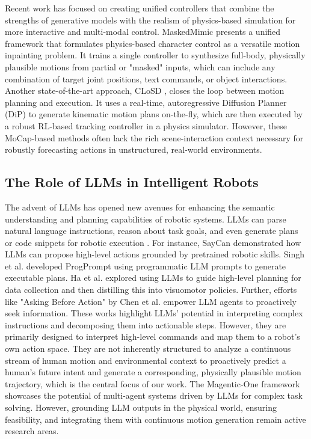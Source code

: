\documentclass[biomimetics,article,submit,pdftex,moreauthors]{Definitions/mdpi}
\begin{document}
Recent work has focused on creating unified controllers that combine the strengths of generative models with the realism of physics-based simulation for more interactive and multi-modal control. MaskedMimic \citep{tessler2024masked} presents a unified framework that formulates physics-based character control as a versatile motion inpainting problem. It trains a single controller to synthesize full-body, physically plausible motions from partial or "masked" inputs, which can include any combination of target joint positions, text commands, or object interactions. Another state-of-the-art approach, CLoSD \citep{tevet2024closd}, closes the loop between motion planning and execution. It uses a real-time, autoregressive Diffusion Planner (DiP) to generate kinematic motion plans on-the-fly, which are then executed by a robust RL-based tracking controller in a physics simulator.  However, these MoCap-based methods often lack the rich scene-interaction context necessary for robustly forecasting actions in unstructured, real-world environments.

\subsection{The Role of LLMs in Intelligent Robots}
The advent of LLMs has opened new avenues for enhancing the semantic understanding and planning capabilities of robotic systems.
LLMs can parse natural language instructions, reason about task goals, and even generate plans or code snippets for robotic execution \citep{Fan2024, Singh2023}.
For instance, SayCan \citep{Ahn2022} demonstrated how LLMs can propose high-level actions grounded by pretrained robotic skills.
Singh et al. \citep{Singh2023} developed ProgPrompt using programmatic LLM prompts to generate executable plans. Ha et al.
\citep{Ha2023} explored using LLMs to guide high-level planning for data collection and then distilling this into visuomotor policies.
Further, efforts like "Asking Before Action" by Chen et al. \citep{Chen2023} empower LLM agents to proactively seek information.
These works highlight LLMs' potential in interpreting complex instructions and decomposing them into actionable steps. However, they are primarily designed to interpret high-level commands and map them to a robot's own action space. They are not inherently structured to analyze a continuous stream of human motion and environmental context to proactively predict a human's future intent and generate a corresponding, physically plausible motion trajectory, which is the central focus of our work.
The Magentic-One framework \citep{magentic} showcases the potential of multi-agent systems driven by LLMs for complex task solving.
However, grounding LLM outputs in the physical world, ensuring feasibility, and integrating them with continuous motion generation remain active research areas.
\end{document}
